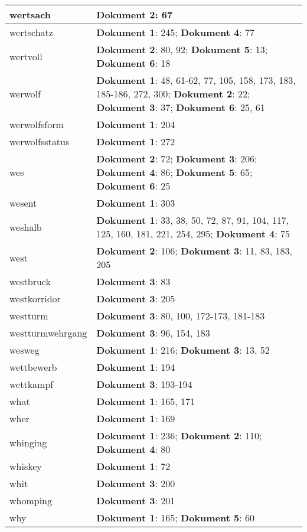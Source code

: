 \documentclass[a5paper]{article}
\begin{document}
\begin{longtable}[l]{|l|p{3in}|}
\hline
wertsach & \textbf{Dokument 2}: 67 \\
\hline
wertschatz & \textbf{Dokument 1}: 245; \textbf{Dokument 4}: 77 \\
\hline
wertvoll & \textbf{Dokument 2}: 80, 92; \textbf{Dokument 5}: 13; \textbf{Dokument 6}: 18 \\
\hline
werwolf & \textbf{Dokument 1}: 48, 61-62, 77, 105, 158, 173, 183, 185-186, 272, 300; \textbf{Dokument 2}: 22; \textbf{Dokument 3}: 37; \textbf{Dokument 6}: 25, 61 \\
\hline
werwolfsform & \textbf{Dokument 1}: 204 \\
\hline
werwolfsstatus & \textbf{Dokument 1}: 272 \\
\hline
wes & \textbf{Dokument 2}: 72; \textbf{Dokument 3}: 206; \textbf{Dokument 4}: 86; \textbf{Dokument 5}: 65; \textbf{Dokument 6}: 25 \\
\hline
wesent & \textbf{Dokument 1}: 303 \\
\hline
weshalb & \textbf{Dokument 1}: 33, 38, 50, 72, 87, 91, 104, 117, 125, 160, 181, 221, 254, 295; \textbf{Dokument 4}: 75 \\
\hline
west & \textbf{Dokument 2}: 106; \textbf{Dokument 3}: 11, 83, 183, 205 \\
\hline
westbruck & \textbf{Dokument 3}: 83 \\
\hline
westkorridor & \textbf{Dokument 3}: 205 \\
\hline
westturm & \textbf{Dokument 3}: 80, 100, 172-173, 181-183 \\
\hline
westturmwehrgang & \textbf{Dokument 3}: 96, 154, 183 \\
\hline
wesweg & \textbf{Dokument 1}: 216; \textbf{Dokument 3}: 13, 52 \\
\hline
wettbewerb & \textbf{Dokument 1}: 194 \\
\hline
wettkampf & \textbf{Dokument 3}: 193-194 \\
\hline
what & \textbf{Dokument 1}: 165, 171 \\
\hline
wher & \textbf{Dokument 1}: 169 \\
\hline
whinging & \textbf{Dokument 1}: 236; \textbf{Dokument 2}: 110; \textbf{Dokument 4}: 80 \\
\hline
whiskey & \textbf{Dokument 1}: 72 \\
\hline
whit & \textbf{Dokument 3}: 200 \\
\hline
whomping & \textbf{Dokument 3}: 201 \\
\hline
why & \textbf{Dokument 1}: 165; \textbf{Dokument 5}: 60 \\

\end{longtable}
\end{document}
